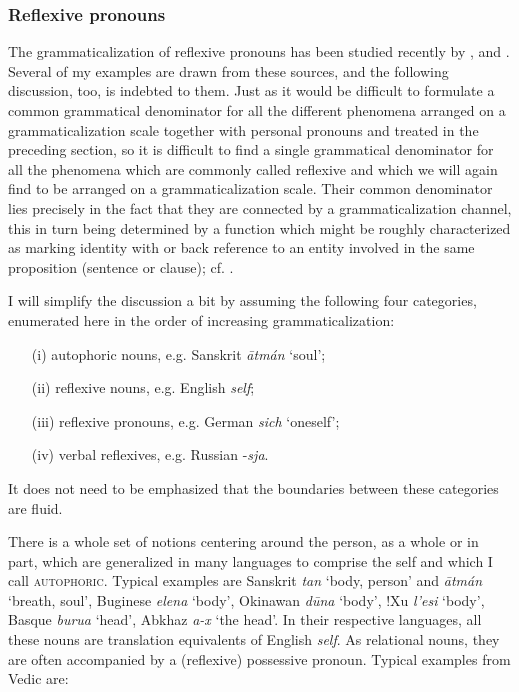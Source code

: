 \subsubsection{Reflexive pronouns} \label{sec:3.2.1.3}
The grammaticalization of reflexive pronouns has been studied recently by \citet[esp. Ch. \textsc{iv}]{Faltz1977}, \citet[640--647; largely based on Faltz]{Edmondson1978} and \citet{Strunk1980}. Several of my examples are drawn from these sources, and the following discussion, too, is indebted to them. Just as it would be difficult to formulate a common grammatical denominator for all the different phenomena arranged on a grammaticalization scale together with personal pronouns and treated in the preceding section, so it is difficult to find a single grammatical denominator for all the phenomena which are commonly called reflexive and which we will again find to be arranged on a grammaticalization scale. Their common denominator lies precisely in the fact that they are connected by a grammaticalization channel, this in turn being determined by a function which might be roughly characterized as marking identity with or back reference to an entity involved in the same proposition (sentence or clause); cf. \citet{Plank1979a}.

I will simplify the discussion a bit by assuming the following four categories, enumerated here in the order of increasing grammaticalization:

\begin{enumerate}
 \item[(i)]   autophoric nouns, e.g. Sanskrit \textit{\=atmán} ‘soul’;
 \item[(ii)]  reflexive nouns, e.g. English \textit{self};
 \item[(iii)]  reflexive pronouns, e.g. German \textit{sich} ‘oneself’; 
 \item[(iv)]  verbal reflexives, e.g. Russian -\textit{sja}.              
\end{enumerate}


\noindent It does not need to be emphasized that the boundaries between these categories are fluid.

There is a whole set of notions centering around the person, as a whole or in part, which are generalized in many languages to comprise the self and which I call \textsc{autophoric}. Typical examples are Sanskrit \textit{tan} ‘body, person’ and \textit{\=atmán} ‘breath, soul’, Buginese \textit{elena} ‘body’, Okinawan \textit{d\=una} ‘body’, !Xu \textit{l'esi} ‘body’, Basque \textit{burua} ‘head’, Abkhaz \textit{a-x} ‘the head’. In their respective languages, all these nouns are translation equivalents of English \textit{self}. As relational nouns, they are often accompanied by a (reflexive) possessive pronoun. Typical examples from Vedic \citep[207f]{Delbrück1888} are:

